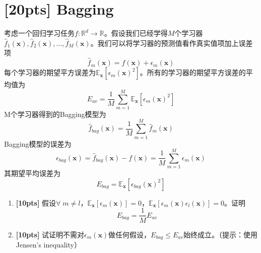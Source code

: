 \documentclass[a4paper,UTF8]{article}
\numberwithin{equation}{section}
\theoremstyle{definition}
\begin{document}
\section{[20pts] Bagging}
考虑一个回归学习任务$f:\mathbb{R}^d \rightarrow \mathbb{R}$。假设我们已经学得$M$个学习器$\hat{f}_1(\mathbf{x}),\hat{f}_2(\mathbf{x}),\dots,\hat{f}_M(\mathbf{x})$。我们可以将学习器的预测值看作真实值项加上误差项
\begin{equation}
\hat{f}_m(\mathbf{x})=f(\mathbf{x})+\epsilon_m(\mathbf{x})
\end{equation}
每个学习器的期望平方误差为$\mathbb{E}_{\mathbf{x}}[\epsilon_m(\mathbf{x})^2]$。所有的学习器的期望平方误差的平均值为
\begin{equation}
E_{av}=\frac{1}{M}\sum_{m=1}^M \mathbb{E}_{\mathbf{x}}[\epsilon_m(\mathbf{x})^2]
\end{equation}
M个学习器得到的Bagging模型为
\begin{equation}
\hat{f}_{bag}(\mathbf{x})=\frac{1}{M}\sum_{m=1}^M \hat{f}_m(\mathbf{x})
\end{equation}
Bagging模型的误差为
\begin{equation}
\epsilon_{bag}(\mathbf{x})=\hat{f}_{bag}(\mathbf{x})-f(\mathbf{x})=\frac{1}{M}\sum_{m=1}^M \epsilon_m(\mathbf{x})
\end{equation}
其期望平均误差为
\begin{equation}
E_{bag}=\mathbb{E}_{\mathbf{x}}[\epsilon_{bag}(\mathbf{x})^2]
\end{equation}
\begin{enumerate}[ {(}1{)}]
\item \textbf{[10pts]} 假设$\forall\; m\neq l$，$ \mathbb{E}_{\mathbf{x}}[\epsilon_m(\mathbf{x})]=0$，$ \mathbb{E}_{\mathbf{x}}[\epsilon_m(\mathbf{x})\epsilon_l(\mathbf{x})]=0$。证明
\begin{equation}
E_{bag}=\frac{1}{M} E_{av}
\end{equation}

\item  \textbf{[10pts]} 试证明不需对$\epsilon_m(\mathbf{x})$做任何假设，$E_{bag}\leq E_{av}$始终成立。（提示：使用Jensen's inequality）
\end{enumerate}
\end{document}
